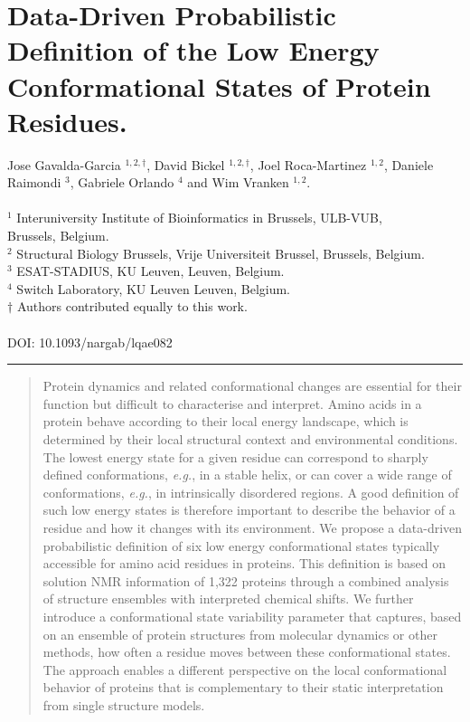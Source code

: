 \chapter{Data-Driven Probabilistic Definition of the Low Energy Conformational States of Protein Residues.}\label{chapter:constava}

Jose Gavalda-Garcia $^{1,2,\dag}$, David Bickel $^{1,2,\dag}$, Joel Roca-Martinez $^{1,2}$, Daniele Raimondi $^{3}$, Gabriele Orlando $^{4}$ and Wim Vranken $^{1,2}$.
\\
\\
$^{1}$ Interuniversity Institute of Bioinformatics in Brussels, ULB-VUB, \\Brussels, Belgium.
\\
$^{2}$ Structural Biology Brussels, Vrije Universiteit Brussel, Brussels, Belgium.
\\
$^{3}$ ESAT-STADIUS, KU Leuven, Leuven, Belgium.
\\
$^{4}$ Switch Laboratory, KU Leuven Leuven, Belgium.
\\
$\dag$ Authors contributed equally to this work.
\\
\\
DOI: 10.1093/nargab/lqae082
\vspace{1em}
\hrule
\vspace{1em}

\begin{abstract}
    Protein dynamics and related conformational changes are essential for their function but difficult to characterise and interpret. Amino acids in a protein behave according to their local energy landscape, which is determined by their local structural context and environmental conditions. The lowest energy state for a given residue can correspond to sharply defined conformations, \textit{e.g.}, in a stable helix, or can cover a wide range of conformations, \textit{e.g.}, in intrinsically disordered regions. A good definition of such low energy states is therefore important to describe the behavior of a residue and how it changes with its environment. We propose a data-driven probabilistic definition of six low energy conformational states typically accessible for amino acid residues in proteins. This definition is based on solution NMR information of 1,322 proteins through a combined analysis of structure ensembles with interpreted chemical shifts. We further introduce a conformational state variability parameter that captures, based on an ensemble of protein structures from molecular dynamics or other methods, how often a residue moves between these conformational states. The approach enables a different perspective on the local conformational behavior of proteins that is complementary to their static interpretation from single structure models.
\end{abstract}


